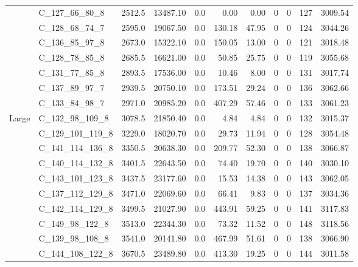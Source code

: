 \begin{tabular}{llrrrrrrrrr}
      & C\_127\_66\_80\_8 &  2512.5 &  13487.10 &  0.0 &    0.00 &     0.00 &    0 &    0 &         127 &  3009.54 \\
      & C\_128\_68\_74\_7 &  2595.0 &  19067.50 &  0.0 &  130.18 &    47.95 &    0 &    0 &         124 &  3044.26 \\
      & C\_136\_85\_97\_8 &  2673.0 &  15322.10 &  0.0 &  150.05 &    13.00 &    0 &    0 &         121 &  3018.48 \\
      & C\_128\_78\_85\_8 &  2685.5 &  16621.00 &  0.0 &   50.85 &    25.75 &    0 &    0 &         119 &  3055.68 \\
      & C\_131\_77\_85\_8 &  2893.5 &  17536.00 &  0.0 &   10.46 &     8.00 &    0 &    0 &         131 &  3017.74 \\
      & C\_137\_89\_97\_7 &  2939.5 &  20750.10 &  0.0 &  173.51 &    29.24 &    0 &    0 &         136 &  3062.66 \\
      & C\_133\_84\_98\_7 &  2971.0 &  20985.20 &  0.0 &  407.29 &    57.46 &    0 &    0 &         133 &  3061.23 \\
Large & C\_132\_98\_109\_8 &  3078.5 &  21850.40 &  0.0 &    4.84 &     4.84 &    0 &    0 &         132 &  3015.37 \\
      & C\_129\_101\_119\_8 &  3229.0 &  18020.70 &  0.0 &   29.73 &    11.94 &    0 &    0 &         128 &  3054.48 \\
      & C\_141\_114\_136\_8 &  3350.5 &  20638.30 &  0.0 &  209.77 &    52.30 &    0 &    0 &         138 &  3066.87 \\
      & C\_140\_114\_132\_8 &  3401.5 &  22643.50 &  0.0 &   74.40 &    19.70 &    0 &    0 &         140 &  3030.10 \\
      & C\_143\_101\_123\_8 &  3437.5 &  23177.60 &  0.0 &   15.53 &    14.38 &    0 &    0 &         143 &  3062.05 \\
      & C\_137\_112\_129\_8 &  3471.0 &  22069.60 &  0.0 &   66.41 &     9.83 &    0 &    0 &         137 &  3034.36 \\
      & C\_142\_114\_129\_8 &  3499.5 &  21027.90 &  0.0 &  443.91 &    59.25 &    0 &    0 &         141 &  3117.83 \\
      & C\_149\_98\_122\_8 &  3513.0 &  22344.30 &  0.0 &   73.32 &    11.52 &    0 &    0 &         148 &  3118.56 \\
      & C\_139\_98\_108\_8 &  3541.0 &  20141.80 &  0.0 &  467.99 &    51.61 &    0 &    0 &         138 &  3066.90 \\
      & C\_144\_108\_122\_8 &  3670.5 &  23489.80 &  0.0 &  413.30 &    19.25 &    0 &    0 &         144 &  3011.58 \\

\end{tabular}
